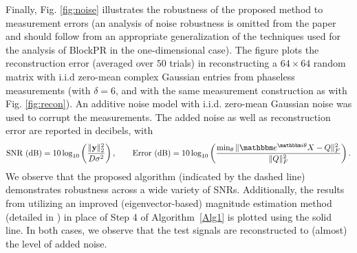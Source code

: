Finally, Fig. \ref{fig:noise} illustrates the robustness of the proposed method to measurement
errors (an analysis of noise robustness is omitted from the paper and should follow from an appropriate generalization of the techniques used for the analysis of BlockPR\cite{iwen2016phase} in the one-dimensional case). The figure plots the reconstruction error (averaged over $50$ trials) in reconstructing a
$64\times 64$ random matrix with i.i.d zero-mean complex Gaussian entries from phaseless
measurements (with $\delta=6$, and with the same measurement construction as with Fig.
\ref{fig:recon}). An additive noise model with i.i.d. zero-mean Gaussian noise was used to corrupt
the measurements. The added noise as well as reconstruction error are reported in decibels, with
%
\[  \text{SNR (dB)} = 10 \log_{10}\left( \frac{\Vert \y \Vert_2^2}{D\sigma^2}\right), \qquad 
    \text{Error (dB)} = 10 \log_{10} \left( \frac{\min_\theta\Vert \mathbbm 
                e^{\mathbbm i \theta}X-Q\Vert^2_F}{\Vert Q\Vert^2_F}\right). \]
%
We observe that the proposed algorithm (indicated by the dashed line) demonstrates robustness 
across a wide variety of SNRs. Additionally, the results from utilizing an improved
(eigenvector-based) magnitude estimation method (detailed in \cite[Section 6.1]{iwen2016phase}) 
in place of Step 4 of Algorithm~\ref{Alg1} is plotted using the solid line. In both cases, we
observe that the test signals are reconstructed to (almost) the level of added noise. 
%
